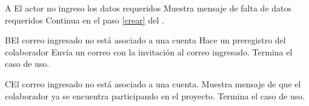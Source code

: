 		\begin{UCtrayectoriaA}{A}{ El actor no ingreso los datos requeridos}
			\UCpaso Muestra mensaje de falta de datos requeridos
			\UCpaso Continua en el paso \ref{crear} del .
		\end{UCtrayectoriaA}
        
        
		\begin{UCtrayectoriaA}{B}{El correo ingresado no está asociado a una cuenta}
			\UCpaso Hace un preregistro del colaborador
			\UCpaso Envía un correo con la invitación al correo ingresado.
            \UCpaso[] Termina el caso de uso.
		\end{UCtrayectoriaA}
		\begin{UCtrayectoriaA}{C}{El correo ingresado no está asociado a una cuenta. }
			\UCpaso Muestra mensaje de que el colaborador ya se encuentra participando en el proyecto.
            \UCpaso[] Termina el caso de uso.
		\end{UCtrayectoriaA}
		
		
